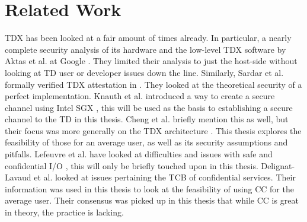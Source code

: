 \section{Related Work}
TDX has been looked at a fair amount of times already. In particular, a nearly complete security analysis of its hardware and the low-level TDX software by Aktas et al. at Google \cite{aktas_intel_security}. They limited their analysis to just the host-side without looking at TD user or developer issues down the line. Similarly, Sardar et al. formally verified TDX attestation in \cite{sardar_demystifying_2021}. They looked at the theoretical security of a perfect implementation. Knauth et al. introduced a way to create a secure channel using Intel SGX \cite{knauth_integrating_2019}, this will be used as the basis to establishing a secure channel to the TD in this thesis. Cheng et al. briefly mention this as well, but their focus was more generally on the TDX architecture \cite{cheng_intel_tdx_demystified_2023}. This thesis explores the feasibility of those for an average user, as well as its security assumptions and pitfalls. Lefeuvre et al. have looked at difficulties and issues with safe and confidential I/O \cite{lefeuvre_towards_safe_and_fast_cc_io_2023}, this will only be briefly touched upon in this thesis. Delignat-Lavaud et al. looked at issues pertaining the TCB of confidential services. Their information was used in this thesis to look at the feasibility of using CC for the average user. Their consensus was picked up in this thesis that while CC is great in theory, the practice is lacking.

